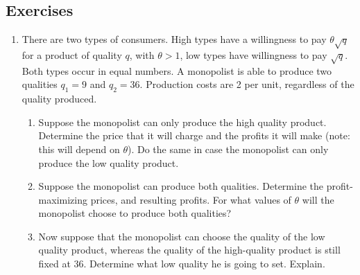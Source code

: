 \subsection{Exercises}
\begin{enumerate}
	\item There are two types of consumers. High types have a willingness to pay $\theta\sqrt{q}$ for a
	      product of quality $q$, with $\theta > 1$, low types have willingness to pay $\sqrt{q}$. Both types
	      occur in equal numbers. A monopolist is able to produce two qualities $q_1 = 9$ and
	      $q_2 = 36$. Production costs are 2 per unit, regardless of the quality produced.
	      \begin{enumerate}
		      \item Suppose the monopolist can only produce the high quality product. Determine
		            the price that it will charge and the profits it will make (note: this will depend
		            on $\theta$). Do the same in case the monopolist can only produce the low quality
		            product.
		      \item Suppose the monopolist can produce both qualities. Determine the profit-
		            maximizing prices, and resulting profits. For what values of $\theta$ will the monopolist choose to produce both qualities?
		      \item Now suppose that the monopolist can choose the quality of the low quality
		            product, whereas the quality of the high-quality product is still fixed at 36.
		            Determine what low quality he is going to set. Explain.
	      \end{enumerate}


\end{enumerate}
